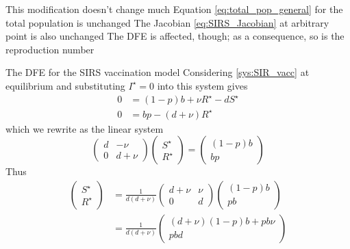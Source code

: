 \documentclass[aspectratio=169]{beamer}\usepackage[]{graphicx}\usepackage[]{xcolor}
\begin{document}
\begin{frame}{This modification doesn't change much}
Equation \eqref{eq:total_pop_general} for the total population is unchanged
\vfill
The Jacobian \eqref{eq:SIRS_Jacobian} at arbitrary point is also unchanged
\vfill 
The DFE is affected, though; as a consequence, so is the reproduction number
\end{frame}

\begin{frame}{The DFE for the SIRS vaccination model}
Considering \eqref{sys:SIR_vacc} at equilibrium and substituting $I^\star=0$ into this system gives
\begin{align*}
0 &= (1-p)b+\nu R^\star-dS^\star \\
0 &= bp-(d+\nu)R^\star
\end{align*}
which we rewrite as the linear system
\[
\begin{pmatrix}
d & -\nu \\ 0 & d+\nu
\end{pmatrix}
\begin{pmatrix}
S^\star \\ R^\star
\end{pmatrix}
=
\begin{pmatrix}
(1-p)b \\ bp
\end{pmatrix}
\]
Thus
\begin{align*}
\begin{pmatrix}
S^\star \\ R^\star
\end{pmatrix}
&= \frac{1}{d(d+\nu)}
\begin{pmatrix}
d+\nu & \nu \\ 0 & d
\end{pmatrix}
\begin{pmatrix}
(1-p)b \\ pb
\end{pmatrix} \\
&= \frac{1}{d(d+\nu)}
\begin{pmatrix}
(d+\nu)(1-p)b+pb\nu \\ pbd
\end{pmatrix}
\end{align*}
\end{frame}
\end{document}
